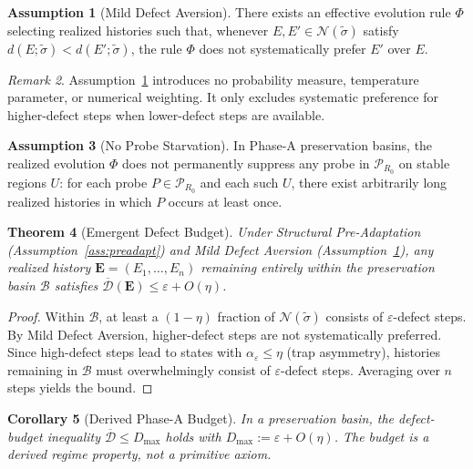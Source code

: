 \documentclass[11pt,a4paper]{article}
\newtheorem{theorem}{Theorem}[section]
\newtheorem{corollary}[theorem]{Corollary}
\theoremstyle{definition}
\newtheorem{assumption}[theorem]{Assumption}
\theoremstyle{remark}
\newtheorem{remark}[theorem]{Remark}
\begin{document}
\begin{assumption}[Mild Defect Aversion]\label{ass:mild}
There exists an effective evolution rule $\Phi$ selecting realized histories such that, whenever $E, E' \in \mathcal{N}(\tilde{\sigma})$ satisfy $d(E; \tilde{\sigma}) < d(E'; \tilde{\sigma})$, the rule $\Phi$ does not systematically prefer $E'$ over $E$.
\end{assumption}

\begin{remark}
Assumption~\ref{ass:mild} introduces no probability measure, temperature parameter, or numerical weighting. It only excludes systematic preference for higher-defect steps when lower-defect steps are available.
\end{remark}

\begin{assumption}[No Probe Starvation]\label{ass:nps}
In Phase-A preservation basins, the realized evolution $\Phi$ does not permanently suppress any probe in $\mathcal{P}_{R_0}$ on stable regions $U$: for each probe $P \in \mathcal{P}_{R_0}$ and each such $U$, there exist arbitrarily long realized histories in which $P$ occurs at least once.
\end{assumption}

\begin{theorem}[Emergent Defect Budget]\label{thm:budget}
Under Structural Pre-Adaptation (Assumption~\ref{ass:preadapt}) and Mild Defect Aversion (Assumption~\ref{ass:mild}), any realized history $\mathbf{E} = (E_1, \dots, E_n)$ remaining entirely within the preservation basin $\mathcal{B}$ satisfies $\overline{\mathcal{D}}(\mathbf{E}) \leq \varepsilon + O(\eta)$.
\end{theorem}
\begin{proof}
Within $\mathcal{B}$, at least a $(1-\eta)$ fraction of $\mathcal{N}(\tilde{\sigma})$ consists of $\varepsilon$-defect steps. By Mild Defect Aversion, higher-defect steps are not systematically preferred. Since high-defect steps lead to states with $\alpha_\varepsilon \leq \eta$ (trap asymmetry), histories remaining in $\mathcal{B}$ must overwhelmingly consist of $\varepsilon$-defect steps. Averaging over $n$ steps yields the bound.
\end{proof}

\begin{corollary}[Derived Phase-A Budget]\label{cor:budget}
In a preservation basin, the defect-budget inequality $\overline{\mathcal{D}} \leq D_{\max}$ holds with $D_{\max} := \varepsilon + O(\eta)$. The budget is a \emph{derived regime property}, not a primitive axiom.
\end{corollary}
\end{document}
